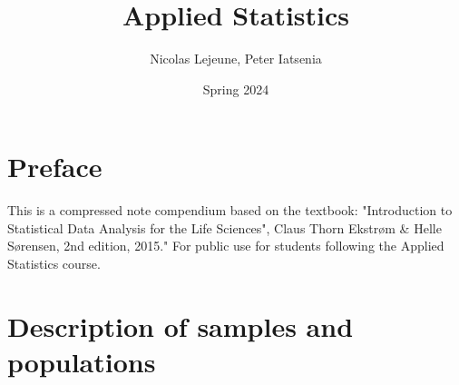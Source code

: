 \documentclass{article}
\title{Applied Statistics}
\author{Nicolas Lejeune, Peter Iatsenia}
\date{Spring 2024}
\begin{document}
\maketitle

\tableofcontents

\pagebreak

\section*{Preface}
This is a compressed note compendium based on the textbook: "Introduction to Statistical Data Analysis for the Life Sciences", Claus Thorn Ekstrøm \& Helle Sørensen, 2nd edition, 2015." For public use for students following the Applied Statistics course.

\section{Description of samples and populations}
\end{document}
